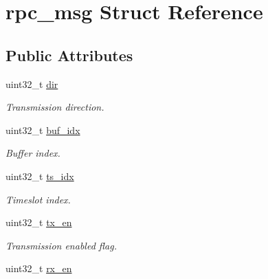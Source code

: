 \hypertarget{structrpc__msg}{\section{rpc\-\_\-msg Struct Reference}
\label{structrpc__msg}
}
\subsection*{Public Attributes}
\begin{DoxyCompactItemize}
\item 
\hypertarget{structrpc__msg_ad898a6e9c0965660b31f8fadaf8d602d}{uint32\-\_\-t \hyperlink{structrpc__msg_ad898a6e9c0965660b31f8fadaf8d602d}{dir}}\label{structrpc__msg_ad898a6e9c0965660b31f8fadaf8d602d}

\begin{DoxyCompactList}\small\item\em Transmission direction. \end{DoxyCompactList}\item 
\hypertarget{structrpc__msg_ac4e74c1a1c8a7d2ae9a95f95ae7ad1ac}{uint32\-\_\-t \hyperlink{structrpc__msg_ac4e74c1a1c8a7d2ae9a95f95ae7ad1ac}{buf\-\_\-idx}}\label{structrpc__msg_ac4e74c1a1c8a7d2ae9a95f95ae7ad1ac}

\begin{DoxyCompactList}\small\item\em Buffer index. \end{DoxyCompactList}\item 
\hypertarget{structrpc__msg_a4292eff8801a28704fde7158104a78d1}{uint32\-\_\-t \hyperlink{structrpc__msg_a4292eff8801a28704fde7158104a78d1}{ts\-\_\-idx}}\label{structrpc__msg_a4292eff8801a28704fde7158104a78d1}

\begin{DoxyCompactList}\small\item\em Timeslot index. \end{DoxyCompactList}\item 
\hypertarget{structrpc__msg_a219459fdfccb367ebd016fe5e884afd4}{uint32\-\_\-t \hyperlink{structrpc__msg_a219459fdfccb367ebd016fe5e884afd4}{tx\-\_\-en}}\label{structrpc__msg_a219459fdfccb367ebd016fe5e884afd4}

\begin{DoxyCompactList}\small\item\em Transmission enabled flag. \end{DoxyCompactList}\item 
\hypertarget{structrpc__msg_a44d820bd01e396767b0b57b346b68b83}{uint32\-\_\-t \hyperlink{structrpc__msg_a44d820bd01e396767b0b57b346b68b83}{rx\-\_\-en}}\label{structrpc__msg_a44d820bd01e396767b0b57b346b68b83}


\end{DoxyCompactItemize}
